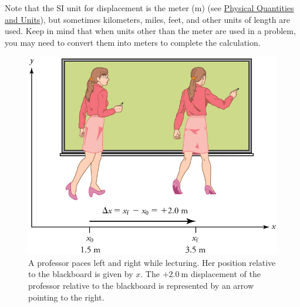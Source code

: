\documentclass[
]{book}
\begin{document}
Note that the SI unit for displacement is the meter (m) (see \href{/m54765}{Physical
Quantities and Units}), but sometimes kilometers, miles, feet,
and other units of length are used. Keep in mind that when units other
than the meter are used in a problem, you may need to convert them into
meters to complete the calculation.

\begin{figure}
\hypertarget{import-auto-id2972079}{%
\centering
\includegraphics{images/Figure_02_01_01.jpg}
\caption{A professor paces left and right while lecturing. Her position
relative to the blackboard is given by \(x{}\). The
\({{+ 2}\text{.}0\ \text{m}}{}\) displacement of the professor relative to
the blackboard is represented by an arrow pointing to the
right.}\label{import-auto-id2972079}
}
\end{figure}
\end{document}
